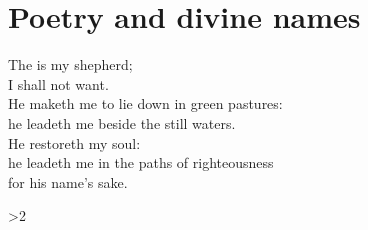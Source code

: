 \documentclass[11pt]{article}
\begin{document}
\section*{Poetry and divine names}
\begin{scripture}[Psalm 23:1--3][version=KJV]
\begin{poetry}
The  is my shepherd;\\
I shall not want.\\
He maketh me to lie down in green pastures:\\
he leadeth me beside the still waters.\\
He restoreth my soul:\\
he leadeth me in the paths of righteousness\\
for his name's sake.
\end{poetry}
\end{scripture}
\ifnum\headingreserves>2\else{}\fi
\end{document}
